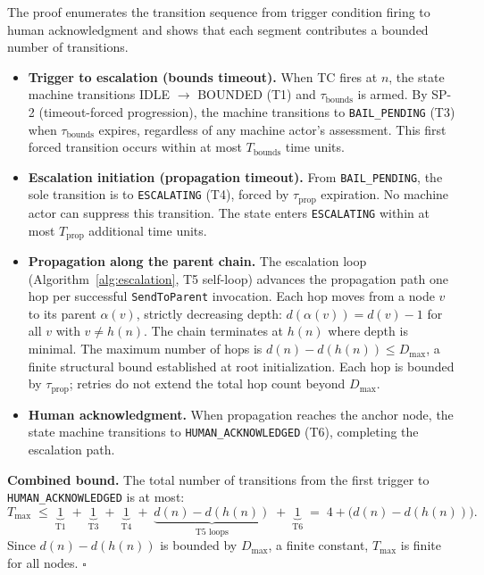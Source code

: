 \begin{Proof}
The proof enumerates the transition sequence from trigger condition firing to
human acknowledgment and shows that each segment contributes a bounded number of
transitions.

\begin{itemize}\itemsep=0pt
\item \textbf{Trigger to escalation (bounds timeout).}  When TC fires at $n$,
the state machine transitions IDLE $\rightarrow$ BOUNDED (T1) and
$\tau_{\text{bounds}}$ is armed.  By SP-2 (timeout-forced progression), the
machine transitions to \texttt{BAIL\_PENDING} (T3) when $\tau_{\text{bounds}}$
expires, regardless of any machine actor's assessment.  This first forced
transition occurs within at most $T_{\text{bounds}}$ time units.

\item \textbf{Escalation initiation (propagation timeout).}  From
\texttt{BAIL\_PENDING}, the sole transition is to \texttt{ESCALATING} (T4),
forced by $\tau_{\text{prop}}$ expiration.  No machine actor can suppress this
transition.  The state enters \texttt{ESCALATING} within at most
$T_{\text{prop}}$ additional time units.

\item \textbf{Propagation along the parent chain.}  The escalation loop
(Algorithm~\ref{alg:escalation}, T5 self-loop) advances the propagation path one
hop per successful \texttt{SendToParent} invocation.  Each hop moves from a node
$v$ to its parent $\alpha(v)$, strictly decreasing depth:
$d(\alpha(v)) = d(v) - 1$ for all $v$ with $v \neq h(n)$.  The chain terminates
at $h(n)$ where depth is minimal.  The maximum number of hops is
$d(n) - d(h(n)) \leq D_{\max}$, a finite structural bound established at root
initialization.  Each hop is bounded by $\tau_{\text{prop}}$; retries do not
extend the total hop count beyond $D_{\max}$.

\item \textbf{Human acknowledgment.}  When propagation reaches the anchor node,
the state machine transitions to \texttt{HUMAN\_ACKNOWLEDGED} (T6), completing the
escalation path.
\end{itemize}

\textbf{Combined bound.}  The total number of transitions from the first
trigger to \texttt{HUMAN\_ACKNOWLEDGED} is at most:
\begin{equation}
T_{\max} \;\leq\;
\underbrace{1}_{\text{T1}} \;+\;
\underbrace{1}_{\text{T3}} \;+\;
\underbrace{1}_{\text{T4}} \;+\;
\underbrace{d(n) - d(h(n))}_{\text{T5 loops}} \;+\;
\underbrace{1}_{\text{T6}}
\;=\; 4 + \bigl(d(n) - d(h(n))\bigr).
\end{equation}
Since $d(n) - d(h(n))$ is bounded by $D_{\max}$, a finite constant,
$T_{\max}$ is finite for all nodes.  $\square$
\end{Proof}


